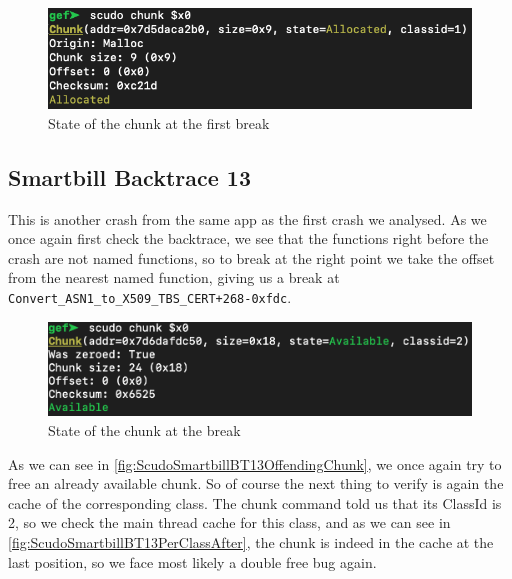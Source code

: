\documentclass[a4paper,11pt,oneside]{report}
\begin{document}
\begin{figure}[h!]
  \centering
  \includegraphics[width=\linewidth]{figures/ScudoV3MobilePlusChunkBefore.png}
  \caption{State of the chunk at the first break}
  \label{fig:ScudoV3MobilePlusChunkBefore}
\end{figure}

\subsection{Smartbill Backtrace 13}

This is another crash from the same app as the first crash we analysed. As we
once again first check the backtrace, we see that the functions right before the
crash are not named functions, so to break at the right point we take the offset
from the nearest named function, giving us a break at \verb|Convert_ASN1_to_X509_TBS_CERT+268-0xfdc|.

\begin{figure}[h!]
  \centering
  \includegraphics[width=\linewidth]{figures/ScudoSmartbillBT13OffendingChunk.png}
  \caption{State of the chunk at the break}
  \label{fig:ScudoSmartbillBT13OffendingChunk}
\end{figure}

As we can see in \autoref{fig:ScudoSmartbillBT13OffendingChunk}, we once again
try to free an already available chunk. So of course the next thing to verify
is again the cache of the corresponding class. The chunk command told us that
its ClassId is 2, so we check the main thread cache for this class, and as we
can see in \autoref{fig:ScudoSmartbillBT13PerClassAfter}, the chunk is indeed
in the cache at the last position, so we face most likely a double free bug
again.
\end{document}
